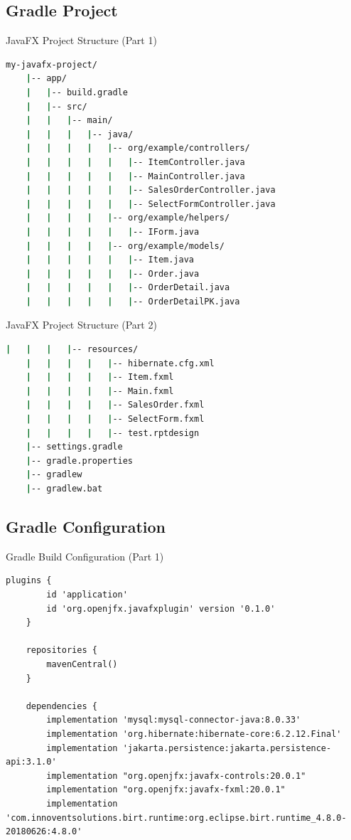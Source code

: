 \documentclass[aspectratio=169, table]{beamer}
\begin{document}
\subsection{Gradle Project}
\begin{frame}[fragile]{JavaFX Project Structure (Part 1)}
\vspace{20pt}
\begin{lstlisting}[language=bash]
	my-javafx-project/
	|-- app/
	|   |-- build.gradle
	|   |-- src/
	|   |   |-- main/
	|   |   |   |-- java/
	|   |   |   |   |-- org/example/controllers/
	|   |   |   |   |   |-- ItemController.java
	|   |   |   |   |   |-- MainController.java
	|   |   |   |   |   |-- SalesOrderController.java
	|   |   |   |   |   |-- SelectFormController.java
	|   |   |   |   |-- org/example/helpers/
	|   |   |   |   |   |-- IForm.java
	|   |   |   |   |-- org/example/models/
	|   |   |   |   |   |-- Item.java
	|   |   |   |   |   |-- Order.java
	|   |   |   |   |   |-- OrderDetail.java
	|   |   |   |   |   |-- OrderDetailPK.java
\end{lstlisting}
\end{frame}

\begin{frame}[fragile]{JavaFX Project Structure (Part 2)}
\vspace{20pt}
\begin{lstlisting}[language=bash]
	|   |   |   |-- resources/
	|   |   |   |   |-- hibernate.cfg.xml
	|   |   |   |   |-- Item.fxml
	|   |   |   |   |-- Main.fxml
	|   |   |   |   |-- SalesOrder.fxml
	|   |   |   |   |-- SelectForm.fxml
	|   |   |   |   |-- test.rptdesign
	|-- settings.gradle
	|-- gradle.properties
	|-- gradlew
	|-- gradlew.bat
\end{lstlisting}
\end{frame}

\subsection{Gradle Configuration}
\begin{frame}[fragile]{Gradle Build Configuration (Part 1)}
\vspace{20pt}
\begin{lstlisting}[style=JavaStyle]
	plugins {
		id 'application'
		id 'org.openjfx.javafxplugin' version '0.1.0'
	}
	
	repositories {
		mavenCentral()
	}
	
	dependencies {
		implementation 'mysql:mysql-connector-java:8.0.33'
		implementation 'org.hibernate:hibernate-core:6.2.12.Final'
		implementation 'jakarta.persistence:jakarta.persistence-api:3.1.0'
		implementation "org.openjfx:javafx-controls:20.0.1"
		implementation "org.openjfx:javafx-fxml:20.0.1"
		implementation 'com.innoventsolutions.birt.runtime:org.eclipse.birt.runtime_4.8.0-20180626:4.8.0'
	\end{lstlisting}
\end{frame}
\end{document}
